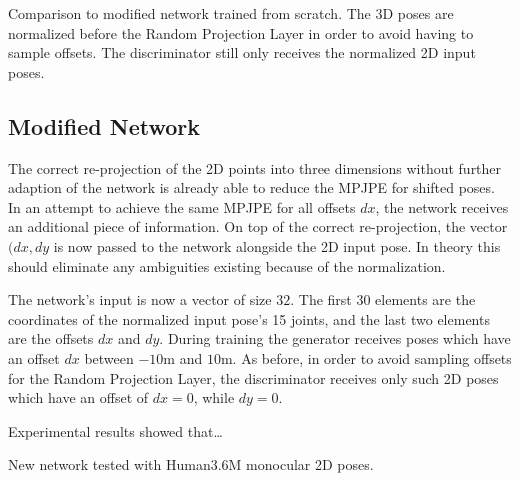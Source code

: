 Comparison to modified network trained from scratch.
The 3D poses are normalized before the Random Projection Layer in order to avoid having to sample offsets.
The discriminator still only receives the normalized 2D input poses.


\subsection{Modified Network}
The correct re-projection of the 2D points into three dimensions without further adaption of the network is already able to reduce the MPJPE for shifted poses.
In an attempt to achieve the same MPJPE for all offsets $dx$, the network receives an additional piece of information.
On top of the correct re-projection, the vector $(dx, dy$ is now passed to the network alongside the 2D input pose.
In theory this should eliminate any ambiguities existing because of the normalization.

The network's input is now a vector of size $32$. 
The first $30$ elements are the coordinates of the normalized input pose's 15 joints, and the last two elements are the offsets $dx$ and $dy$.
During training the generator receives poses which have an offset $dx$ between $-10$m and $10$m.
As before, in order to avoid sampling offsets for the Random Projection Layer, the discriminator receives only such 2D poses which have an offset of $dx = 0$, while $dy = 0$.

Experimental results showed that\dots

New network tested with Human3.6M monocular 2D poses.


